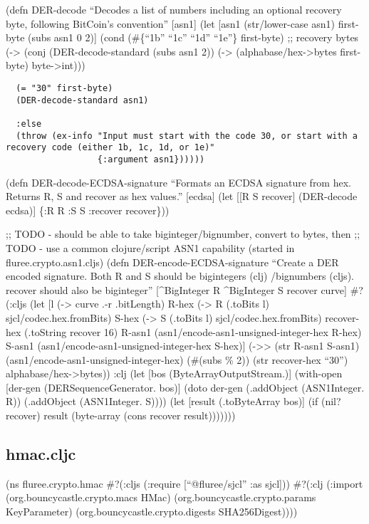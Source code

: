 \documentclass[
]{article}
\begin{document}
(defn DER-decode ``Decodes a list of numbers including an optional
recovery byte, following BitCoin's convention'' {[}asn1{]} (let {[}asn1
(str/lower-case asn1) first-byte (subs asn1 0 2){]} (cond (\#\{``1b''
``1c'' ``1d'' ``1e''\} first-byte) ;; recovery bytes (-\textgreater{}
(conj (DER-decode-standard (subs asn1 2)) (-\textgreater{}
(alphabase/hex-\textgreater bytes first-byte) byte-\textgreater int)))

\begin{verbatim}
  (= "30" first-byte) 
  (DER-decode-standard asn1) 

  :else 
  (throw (ex-info "Input must start with the code 30, or start with a recovery code (either 1b, 1c, 1d, or 1e)" 
                  {:argument asn1}))))) 
\end{verbatim}

(defn DER-decode-ECDSA-signature ``Formats an ECDSA signature from hex.
Returns R, S and recover as hex values.'' {[}ecdsa{]} (let {[}{[}R S
recover{]} (DER-decode ecdsa){]} \{:R R :S S :recover recover\}))

;; TODO - should be able to take biginteger/bignumber, convert to bytes,
then ;; TODO - use a common clojure/script ASN1 capability (started in
fluree.crypto.asn1.cljs) (defn DER-encode-ECDSA-signature ``Create a DER
encoded signature. Both R and S should be bigintegers (clj) /bignumbers
(cljs). recover should also be biginteger'' {[}\^{}BigInteger R
\^{}BigInteger S recover curve{]} \#?(:cljs (let {[}l (-\textgreater{}
curve .-r .bitLength) R-hex (-\textgreater{} R (.toBits l)
sjcl/codec.hex.fromBits) S-hex (-\textgreater{} S (.toBits l)
sjcl/codec.hex.fromBits) recover-hex (.toString recover 16) R-asn1
(asn1/encode-asn1-unsigned-integer-hex R-hex) S-asn1
(asn1/encode-asn1-unsigned-integer-hex S-hex){]}
(-\textgreater\textgreater{} (str R-asn1 S-asn1)
(asn1/encode-asn1-unsigned-integer-hex) (\#(subs \% 2)) (str recover-hex
``30'') alphabase/hex-\textgreater bytes)) :clj (let {[}bos
(ByteArrayOutputStream.){]} (with-open {[}der-gen (DERSequenceGenerator.
bos){]} (doto der-gen (.addObject (ASN1Integer. R)) (.addObject
(ASN1Integer. S)))) (let {[}result (.toByteArray bos){]} (if (nil?
recover) result (byte-array (cons recover result)))))))

\subsection{hmac.cljc}\label{hmac.cljc}

(ns fluree.crypto.hmac \#?(:cljs (:require {[}``@fluree/sjcl'' :as
sjcl{]})) \#?(:clj (:import (org.bouncycastle.crypto.macs HMac)
(org.bouncycastle.crypto.params KeyParameter)
(org.bouncycastle.crypto.digests SHA256Digest))))
\end{document}
